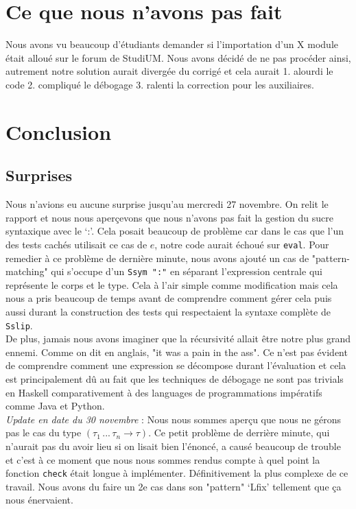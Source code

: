 \documentclass[a4paper,12pt]{article}
\begin{document}
\section{Ce que nous n'avons pas fait}
    Nous avons vu beaucoup d'étudiants demander si l'importation d'un
    X module était alloué sur le forum de StudiUM. Nous avons décidé
    de ne pas procéder ainsi, autrement notre solution aurait divergée
    du corrigé et cela aurait 1. alourdi le code 2. compliqué le 
    débogage 3. ralenti la correction pour les auxiliaires.

\newpage
\section{Conclusion}
    \subsection{Surprises}
        Nous n'avions eu aucune surprise jusqu'au mercredi 27 novembre. On relit le 
        rapport et nous nous aperçevons que nous n'avons pas fait la gestion du sucre
        syntaxique avec le `:'. Cela posait beaucoup de problème car dans le cas que
        l'un des tests cachés utilisait ce cas de $e$, notre code aurait échoué sur
        \texttt{eval}. Pour remedier à ce problème de dernière minute, nous avons 
        ajouté un cas de "pattern-matching" qui s'occupe d'un \texttt{Ssym ":"} en 
        séparant l'expression centrale qui représente le corps et le type. Cela à
        l'air simple comme modification mais cela nous a pris beaucoup de temps avant
        de comprendre comment gérer cela puis aussi durant la construction des tests 
        qui respectaient la syntaxe complète de \texttt{Sslip}. \\

        De plus, jamais nous avons imaginer que la récursivité allait être notre
        plus grand ennemi. Comme on dit en anglais, "it was a pain in the ass". Ce
        n'est pas évident de comprendre comment une expression se décompose durant
        l'évaluation et cela est principalement dû au fait que les techniques de 
        débogage ne sont pas trivials en Haskell comparativement à des languages
        de programmations impératifs comme Java et Python. \\

        \textit{Update en date du 30 novembre} : Nous nous sommes aperçu que 
        nous ne gérons pas le cas du type $(\tau_1\, ...\, \tau_n \rightarrow \tau)$.
        Ce petit problème de derrière minute, qui n'aurait pas du avoir lieu si on 
        lisait bien l'énoncé, a causé beaucoup de trouble et c'est à ce moment que 
        nous nous sommes rendus compte à quel point la fonction \texttt{check} 
        était longue à implémenter. Définitivement la plus complexe de ce travail. 
        Nous avons du faire un 2e cas dans son "pattern" `Lfix' tellement que ça 
        nous énervaient.
\end{document}
